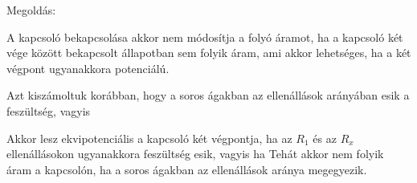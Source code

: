 
\ifdefined\megoldas

 Megoldás: 

 A kapcsoló bekapcsolása akkor nem módosítja a folyó áramot, ha a kapcsoló két vége között bekapcsolt állapotban sem folyik áram, ami akkor lehetséges, ha a két végpont ugyanakkora potenciálú.

 Azt kiszámoltuk korábban, hogy a soros ágakban az ellenállások arányában esik a feszültség, vagyis 

 Akkor lesz ekvipotenciális a kapcsoló két végpontja, ha az $R_1$ és az $R_x$ ellenállásokon ugyanakkora feszültség esik, vagyis ha
 Tehát akkor nem folyik áram a kapcsolón, ha a soros ágakban az ellenállások aránya megegyezik.
 
\fi